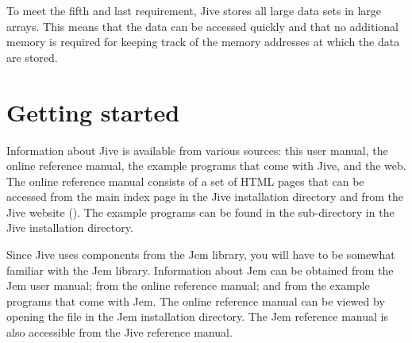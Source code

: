 To meet the fifth and last requirement, Jive stores all large data sets
in large arrays. This means that the data can be accessed quickly and
that no additional memory is required for keeping track of the memory
addresses at which the data are stored.


\section{Getting started}

Information about Jive is available from various sources: this user
manual, the online reference manual, the example programs that come with
Jive, and the web. The online reference manual consists of a set of HTML
pages that can be accessed from the main index page 
in the Jive installation directory and from the Jive website
(\JiveWebsite). The example programs can be found in the 
sub-directory in the Jive installation directory.

Since Jive uses components from the Jem library, you will have to be
somewhat familiar with the Jem library. Information about Jem can be
obtained from the Jem user manual; from the online reference manual; and
from the example programs that come with Jem. The online reference
manual can be viewed by opening the file  in the Jem
installation directory. The Jem reference manual is also accessible from
the Jive reference manual.

